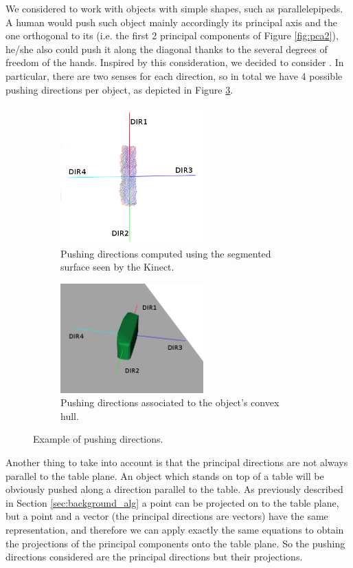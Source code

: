 We considered to work with objects with simple shapes, such as parallelepipeds. 
A human would push such object mainly accordingly its principal axis and the one orthogonal to its (i.e. the first 2 principal components of Figure \ref{fig:pca2}), he/she also could push it along the diagonal thanks to the several degrees of freedom of the hands. 
Inspired by this consideration, we decided to consider . In particular, there are two senses for each direction, so in total we have 4 possible pushing directions per object, as depicted in Figure \ref{fig:directions}.

\begin{figure}
\centering
\begin{subfigure}[t]{6cm}
\includegraphics[width=5.5cm]{Img/pushing/directions.png}
\caption{Pushing directions computed using the segmented surface seen by the Kinect.}\label{fig:directions1}
\end{subfigure}
\quad
\begin{subfigure}[t]{6cm}
\includegraphics[width=5.5cm]{Img/pushing/directions2.png}
\caption{Pushing directions associated to the object's convex hull.}
\label{fig:directions2}
\end{subfigure}
\caption{Example of pushing directions.}\label{fig:directions}
\end{figure}

Another thing to take into account is that the principal directions are not always parallel to the table plane. An object which stands on top of a table will be obviously pushed along a direction parallel to the table. As previously described in Section \ref{sec:background_alg} a point can be projected on to the table plane, but a point and a vector (the principal directions are vectors) have the same representation, and therefore we can apply exactly the same equations to obtain the projections of the principal components onto the table plane. So the pushing directions considered are the principal directions but their projections. 


